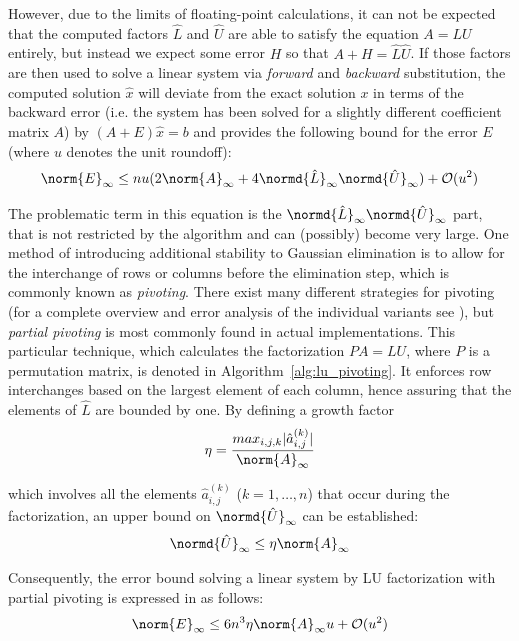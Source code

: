 \noindent However, due to the limits of floating-point calculations, it can not be expected that the computed factors $\hat{L}$ and $\hat{U}$ are able to satisfy the equation $A=LU$ entirely, but instead we expect some error $H$ so that $A + H = \hat{L}\hat{U}$. If those factors are then used to solve a linear system via \textit{forward} and \textit{backward} substitution, the computed solution $\hat{x}$ will deviate from the exact solution $x$ in terms of the backward error (i.e. the system has been solved for a slightly different coefficient matrix $A$) by $(A+E)\hat{x}=b$ and \cite{golub_matrix_2013} provides the following bound for the error $E$ (where $u$ denotes the unit roundoff):
\begin{equation}
    \norm{E}_\infty \leq nu(2\norm{A}_\infty+4\normd{\hat{L}}_\infty\normd{\hat{U}}_\infty) + \mathcal{O}(u^2)
\end{equation}



\noindent The problematic term in this equation is the $\normd{\hat{L}}_\infty\normd{\hat{U}}_\infty$ part, that is not restricted by the algorithm and can (possibly) become very large. One method of introducing additional stability to Gaussian elimination is to allow for the interchange of rows or columns before the elimination step, which is commonly known as \textit{pivoting}. There exist many different strategies for pivoting (for a complete overview and error analysis of the individual variants see \cite{higham_accuracy_2002}), but \textit{partial pivoting} is most commonly found in actual implementations. This particular technique, which calculates the factorization $PA=LU$, where $P$ is a permutation matrix, is denoted in Algorithm~\hyperref[alg:lu_pivoting]{\ref{alg:lu_pivoting}}. It enforces row interchanges based on the largest element of each column, hence assuring that the elements of $\hat{L}$ are bounded by one. By defining a growth factor
\begin{equation}
    \eta = \frac{max_{i,j,k}|\hat{a}_{i,j}^{(k)}|}{\norm{A}_\infty}
\end{equation}

\noindent which involves all the elements $\hat{a}_{i,j}^{(k)}$ ($k=1,\dots, n$) that occur during the factorization, an upper bound on $\normd{\hat{U}}_\infty$ can be established:
\begin{equation}
    \normd{\hat{U}}_\infty \leq \eta \norm{A}_\infty
\end{equation}

\noindent Consequently, the error bound solving a linear system by LU factorization with partial pivoting is expressed in \cite{golub_matrix_2013} as follows:
\begin{equation}
    \norm{E}_\infty \leq 6n^3\eta\norm{A}_\infty u + \mathcal{O}(u^2)
\end{equation}

